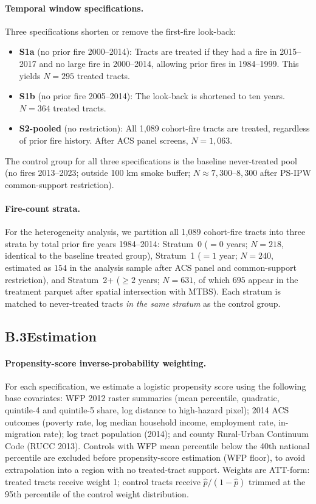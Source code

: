 \documentclass[12pt]{article}
\begin{document}
\paragraph{Temporal window specifications.}
Three specifications shorten or remove the first-fire look-back:
\begin{itemize}
  \item \textbf{S1a} (no prior fire 2000--2014): Tracts are treated if they had a
    fire in 2015--2017 and no large fire in 2000--2014, allowing prior fires in
    1984--1999. This yields $N = 295$ treated tracts.
  \item \textbf{S1b} (no prior fire 2005--2014): The look-back is shortened to ten
    years. $N = 364$ treated tracts.
  \item \textbf{S2-pooled} (no restriction): All 1,089 cohort-fire tracts are treated,
    regardless of prior fire history. After ACS panel screens, $N = 1{,}063$.
\end{itemize}
The control group for all three specifications is the baseline never-treated pool
(no fires 2013--2023; outside 100 km smoke buffer; $N \approx 7{,}300$--$8{,}300$
after PS-IPW common-support restriction).

\paragraph{Fire-count strata.}
For the heterogeneity analysis, we partition all 1,089 cohort-fire tracts into
three strata by total prior fire years 1984--2014:
Stratum~0 ($= 0$ years; $N = 218$, identical to the baseline treated group),
Stratum~1 ($= 1$ year; $N = 240$, estimated as $154$ in the analysis sample after ACS
panel and common-support restriction), and
Stratum~2+ ($\geq 2$ years; $N = 631$, of which $695$ appear in the treatment
parquet after spatial intersection with MTBS).
Each stratum is matched to never-treated tracts \emph{in the same stratum} as the
control group.

\subsection*{B.3\quad Estimation}

\paragraph{Propensity-score inverse-probability weighting.}
For each specification, we estimate a logistic propensity score using the following
base covariates: WFP 2012 raster summaries (mean percentile, quadratic, quintile-4 and
quintile-5 share, log distance to high-hazard pixel); 2014 ACS outcomes (poverty rate,
log median household income, employment rate, in-migration rate); log tract population
(2014); and county Rural-Urban Continuum Code (RUCC 2013).
Controls with WFP mean percentile below the 40th national percentile are excluded
before propensity-score estimation (WFP floor), to avoid extrapolation into a region
with no treated-tract support.
Weights are ATT-form: treated tracts receive weight 1; control tracts receive
$\hat{p}/(1-\hat{p})$ trimmed at the 95th percentile of the control weight
distribution.
\end{document}
